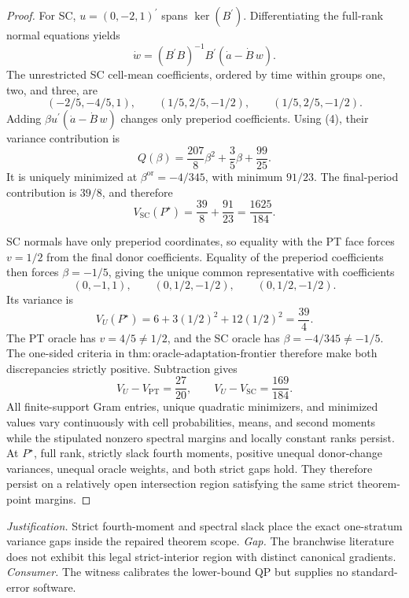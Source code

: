 \documentclass{article}
\begin{document}
\begin{proof}
For SC, \(u=(0,-2,1)^{\prime}\) spans \(\ker(B^{\prime})\).  Differentiating the full-rank normal equations yields
\[
 \dot w=(B^{\prime}B)^{-1}B^{\prime}(\dot a-\dot B\,w).
 \tag{8}
\]
The unrestricted SC cell-mean coefficients, ordered by time within groups one, two, and three, are
\[
 (-2/5,-4/5,1),
 \qquad
 (1/5,2/5,-1/2),
 \qquad
 (1/5,2/5,-1/2).
 \tag{9}
\]
Adding \(\beta u^{\prime}(\dot a-\dot B\,w)\) changes only preperiod coefficients.  Using (4), their variance contribution is
\[
 Q(\beta)=\frac{207}{8}\beta^2+\frac35\beta+\frac{99}{25}.
 \tag{10}
\]
It is uniquely minimized at \(\beta^{\mathrm{or}}=-4/345\), with minimum \(91/23\).  The final-period contribution is \(39/8\), and therefore
\[
 V_{\mathrm{SC}}(P^{\star})=\frac{39}{8}+\frac{91}{23}=\frac{1625}{184}.
 \tag{11}
\]

SC normals have only preperiod coordinates, so equality with the PT face forces \(v=1/2\) from the final donor coefficients.  Equality of the preperiod coefficients then forces \(\beta=-1/5\), giving the unique common representative with coefficients
\[
 (0,-1,1),
 \qquad
 (0,1/2,-1/2),
 \qquad
 (0,1/2,-1/2).
 \tag{12}
\]
Its variance is
\[
 V_U(P^{\star})=6+3(1/2)^2+12(1/2)^2=\frac{39}{4}.
 \tag{13}
\]
The PT oracle has \(v=4/5\ne1/2\), and the SC oracle has \(\beta=-4/345\ne-1/5\).  The one-sided criteria in \(\mathrm{thm{:}oracle\text{-}adaptation\text{-}frontier}\) therefore make both discrepancies strictly positive.  Subtraction gives
\[
 V_U-V_{\mathrm{PT}}=\frac{27}{20},
 \qquad
 V_U-V_{\mathrm{SC}}=\frac{169}{184}.
 \tag{14}
\]
All finite-support Gram entries, unique quadratic minimizers, and minimized values vary continuously with cell probabilities, means, and second moments while the stipulated nonzero spectral margins and locally constant ranks persist.  At \(P^{\star}\), full rank, strictly slack fourth moments, positive unequal donor-change variances, unequal oracle weights, and both strict gaps hold.  They therefore persist on a relatively open intersection region satisfying the same strict theorem-point margins.
\end{proof}
\par\smallskip\noindent \textit{Justification.} Strict fourth-moment and spectral slack place the exact one-stratum variance gaps inside the repaired theorem scope. \textit{Gap.} The branchwise literature does not exhibit this legal strict-interior region with distinct canonical gradients. \textit{Consumer.} The witness calibrates the lower-bound QP but supplies no standard-error software.
\end{document}
